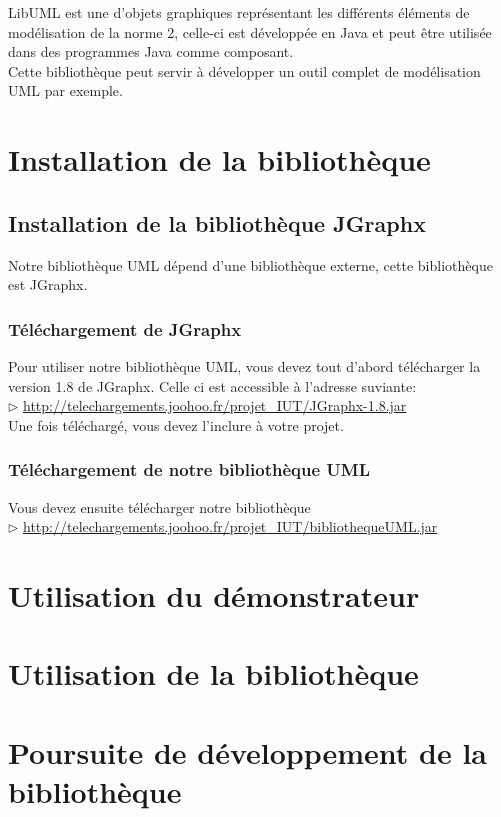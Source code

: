 \documentclass[12pt,a4paper,openany]{report}
\begin{document}
	\maketitle
	\newpage
	\tableofcontents
	\vspace{20px}
	LibUML est une  d'objets graphiques représentant les différents éléments de modélisation de la norme  2, celle-ci 
		est développée en Java et peut être utilisée dans des programmes Java comme composant. \\
		Cette bibliothèque peut servir à développer un outil complet de modélisation UML par exemple.
	\newpage
	\chapter{Installation de la bibliothèque}
	\section{Installation de la bibliothèque JGraphx}
	Notre bibliothèque UML dépend d'une bibliothèque externe, cette bibliothèque est JGraphx.
	\subsection{Téléchargement de JGraphx}
	Pour utiliser notre bibliothèque UML, vous devez tout d'abord télécharger la version 1.8 de JGraphx. Celle ci est accessible à l'adresse suviante:\\
	$\rhd$ \url{http://telechargements.joohoo.fr/projet\_IUT/JGraphx-1.8.jar}\\
	Une fois téléchargé, vous devez l'inclure à votre projet.
	\subsection{Téléchargement de notre bibliothèque UML}
	Vous devez ensuite télécharger notre bibliothèque\\
	$\rhd$ \url{http://telechargements.joohoo.fr/projet\_IUT/bibliothequeUML.jar}\\

	\chapter{Utilisation du démonstrateur}
	\chapter{Utilisation de la bibliothèque}
	\chapter{Poursuite de développement de la bibliothèque}				

	\closeout\glossaireVar
	\appendix
    
\end{document}
